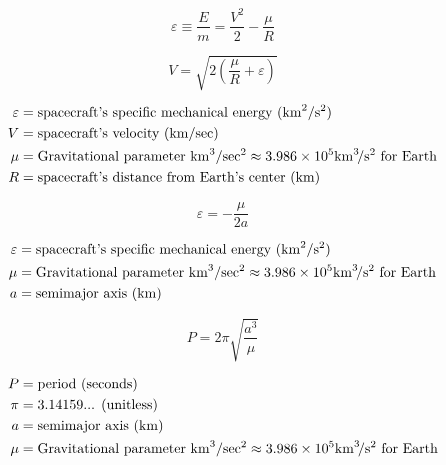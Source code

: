\documentclass{article}
\newcommand{\myvarmukm}{\mu &= \text{Gravitational parameter \si{\kilo\meter\cubed\per\sec\squared}} \approx 3.986 \times 10^5 \si{\kilo\meter\cubed\per\second\squared} \text{ for Earth}}
\newcommand{\myvarv}{V &= \text{spacecraft's velocity (\si{\kilo\meter\per\sec})}}
\newcommand{\myvarepsilon}{\varepsilon &= \text{spacecraft's specific mechanical energy (\si{\kilo\meter\squared\per\second\squared)}}}
\newcommand{\myvara}{a &= \text{semimajor axis (\si{\kilo\meter})}}
\begin{document}
\begin{multicols}{3}
	\begin{equation*}
	\boxed{\varepsilon \equiv \dfrac{E}{m} = \dfrac{V^2}{2} - \dfrac{\mu}{R}}
	\end{equation*}

	\begin{equation*}
	\boxed{V = \sqrt{2(\dfrac{\mu}{R} + \varepsilon)}}
	\end{equation*}

	\vfill\null
	\columnbreak

	\begin{align*}
	\myvarepsilon\\
	\myvarv\\
	\myvarmukm \\
	R &= \text{spacecraft's distance from Earth's center (\si{\kilo\meter})}\\
	\end{align*}
\end{multicols}

\begin{multicols}{3}
	\begin{equation*}
	\boxed{\varepsilon = - \dfrac{\mu}{2a}}
	\end{equation*}

	\vfill\null
	\columnbreak

	\begin{align*}
	\myvarepsilon\\
	\myvarmukm \\
	\myvara\\
	\end{align*}
\end{multicols}

\begin{multicols}{3}
	\begin{equation*}
	\boxed{P = 2\pi\sqrt{\dfrac{a^3}{\mu}}}
	\end{equation*}

	\vfill\null
	\columnbreak

	\begin{align*}
	P &= \text{period (seconds)}\\
	\pi &= \text{3.14159... (unitless)}\\
	\myvara\\
	\myvarmukm \\
	\end{align*}
\end{multicols}
\end{document}
